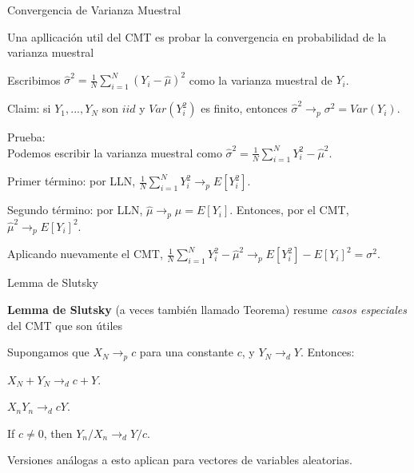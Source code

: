 \documentclass[11pt,handout,aspectratio=169]{beamer}
\newenvironment{wideitemize}{\itemize\addtolength{\itemsep}{10pt}}{\enditemize}
\begin{document}
\begin{frame}{Convergencia de Varianza Muestral}
\begin{wideitemize}
\item
Una apllicación util del CMT es probar la convergencia en probabilidad de la varianza muestral

\pause
\item
Escribimos  $\hat\sigma^2 = \frac{1}{N} \sum_{i=1}^N (Y_i - \hat\mu)^2$ como la varianza muestral de $Y_i$.

\pause
\item
Claim: si $Y_1,...,Y_N$ son $iid$ y $Var(Y_i^2)$ es finito, entonces $\hat\sigma^2 \rightarrow_p \sigma^2 = Var(Y_i)$. 

\pause
\item
Prueba: \\

Podemos escribir la varianza muestral como $\hat\sigma^2 = \frac{1}{N} \sum_{i=1}^N Y_i^2 - \hat\mu^2$. \\ \vspace{.1cm} \pause

Primer término: por LLN, $ \frac{1}{N} \sum_{i=1}^N Y_i^2 \rightarrow_p E[Y_i^2]$. \\ \vspace{.1cm} \pause

Segundo término: por LLN, $\hat\mu \rightarrow_p \mu = E[Y_i]$. Entonces, por el CMT, $\hat\mu^2 \rightarrow_p E[Y_i]^2$.\\ \vspace{.1cm} \pause

Aplicando nuevamente el CMT, $\frac{1}{N} \sum_{i=1}^N Y_i^2 - \hat\mu^2 \rightarrow_p E[Y_i^2] - E[Y_i]^2 = \sigma^2$. 

\end{wideitemize}		
\end{frame}

\begin{frame}{Lemma de Slutsky}

\begin{wideitemize}

\item
\textbf{Lemma de Slutsky} (a veces también llamado Teorema) resume \textit{casos especiales} del CMT que son útiles

\pause
\item
Supongamos que  $X_N \rightarrow_p c$ para una constante $c$, y $Y_N \rightarrow_d Y$. Entonces: 

\item
$X_N + Y_N \rightarrow_d c + Y$. \pause

\item
$X_n Y_n \rightarrow_d c Y$. \pause

\item
If $c \neq 0$, then $Y_n/ X_n \rightarrow_d Y /c$. 

\pause
\item
Versiones análogas a esto aplican para vectores de variables aleatorias.
\end{wideitemize}
	
\end{frame}
\end{document}
